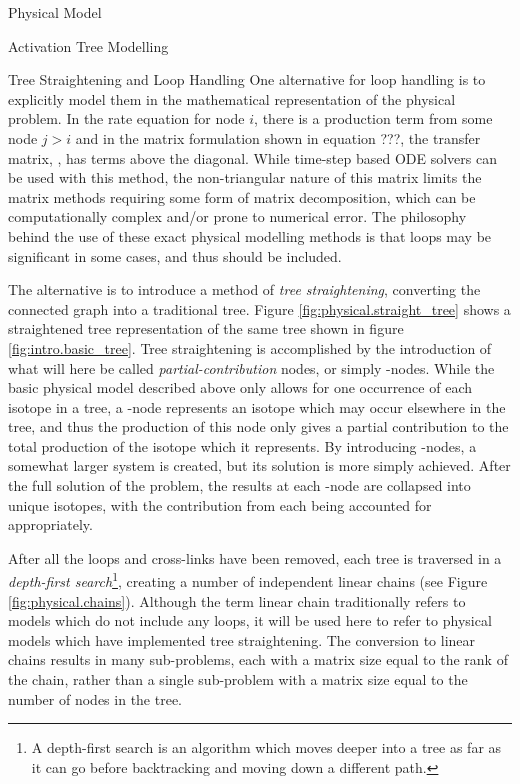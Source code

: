 \begin{chapter}{Physical Model\label{chap:physical}}
\begin{section}{Activation Tree Modelling\label{sec:physical.chains}}
\begin{subsection}{Tree Straightening and Loop Handling}
    One alternative for loop handling is to explicitly model them in
    the mathematical representation of the physical problem.  In the
    rate equation for node $i$, there is a production term from some
    node $j>i$ and in the matrix formulation shown in equation ???,
    the transfer matrix, , has terms above the diagonal.  While
    time-step based ODE solvers can be used with this method, the
    non-triangular nature of this matrix limits the matrix methods
    requiring some form of matrix decomposition, which can be
    computationally complex and/or prone to numerical error.  The
    philosophy behind the use of these exact physical modelling
    methods is that loops may be significant in some cases, and thus
    should be included.
    
    The alternative is to introduce a method of \textsl{tree
      straightening}, converting the connected graph into a
    traditional \nary tree.  Figure \ref{fig:physical.straight_tree}
    shows a straightened tree representation of the same tree shown in
    figure \ref{fig:intro.basic_tree}.  Tree straightening is
    accomplished by the introduction of what will here be called
    \textsl{partial-contribution} nodes, or simply \pc-nodes.  While
    the basic physical model described above only allows for one
    occurrence of each isotope in a tree, a \pc-node represents an
    isotope which may occur elsewhere in the tree, and thus the
    production of this node only gives a partial contribution to the
    total production of the isotope which it represents.  By
    introducing \pc-nodes, a somewhat larger system is created, but
    its solution is more simply achieved.  After the full solution of
    the problem, the results at each \pc-node are collapsed into
    unique isotopes, with the contribution from each being accounted
    for appropriately.
    
    After all the loops and cross-links have been removed, each tree
    is traversed in a \textsl{depth-first search}\footnote{A
      depth-first search is an algorithm which moves deeper into a
      tree as far as it can go before backtracking and moving down a
      different path.}, creating a number of independent linear chains
    (see Figure \ref{fig:physical.chains}).  Although the term linear
    chain traditionally refers to models which do not include any
    loops, it will be used here to refer to physical models which have
    implemented tree straightening.  The conversion to linear chains
    results in many sub-problems, each with a matrix size equal to the
    rank of the chain, rather than a single sub-problem with a matrix
    size equal to the number of nodes in the tree.
    

\end{subsection}
\end{section}
\end{chapter}
